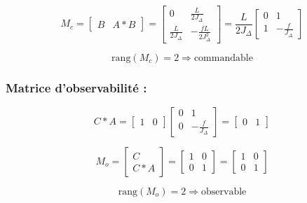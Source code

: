 \begin{equation}
	M_c = \begin{bmatrix}
		B & A * B
	\end{bmatrix}
	= \begin{bmatrix}
		0 & \frac{L}{2J_\Delta} \\
		\frac{L}{2J_\Delta} & -\frac{fL}{2J_\Delta^2}
	\end{bmatrix}
	= \frac{L}{2J_\Delta}
	\begin{bmatrix}
		0 & 1 \\
		1 & -\frac{f}{J_\Delta}
	\end{bmatrix}
\end{equation}

\begin{equation}
	\text{rang}(M_c) = 2 \Rightarrow \text{commandable}
\end{equation}

\subsubsection{Matrice d'observabilité :}

\begin{equation}
	C * A = \begin{bmatrix}
		1 & 0
	\end{bmatrix}
	\begin{bmatrix}
		0 & 1 \\
		0 & -\frac{f}{J_\Delta}
	\end{bmatrix}
	= \begin{bmatrix}
		0 & 1
	\end{bmatrix}
\end{equation}

\begin{equation}
	M_o = \begin{bmatrix}
		C \\
		C * A
	\end{bmatrix}
	= \begin{bmatrix}
		1 & 0 \\
		0 & 1
	\end{bmatrix}
	= \begin{bmatrix}
		1 & 0 \\
		0 & 1
	\end{bmatrix}
\end{equation}

\begin{equation}
	\text{rang}(M_o) = 2 \Rightarrow \text{observable}
\end{equation}


